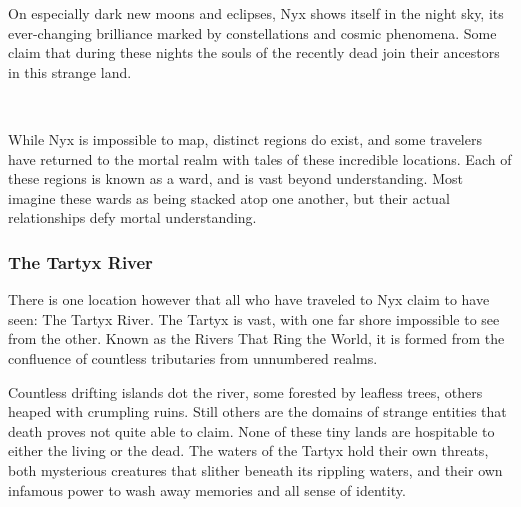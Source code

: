 On especially dark new moons and eclipses, Nyx shows itself in the night sky, its ever-changing brilliance marked by constellations and cosmic phenomena.
Some claim that during these nights the souls of the recently dead join their ancestors in this strange land.

\pagebreak~
\vspace{13.0cm}

While Nyx is impossible to map, distinct regions do exist, and some travelers have returned to the mortal realm with tales of these incredible locations.
Each of these regions is known as a ward, and is vast beyond understanding.
Most imagine these wards as being stacked atop one another, but their actual relationships defy mortal understanding.

\subsubsection{The Tartyx River}
There is one location however that all who have traveled to Nyx claim to have seen: The Tartyx River.
The Tartyx is vast, with one far shore impossible to see from the other.
Known as the Rivers That Ring the World, it is formed from the confluence of countless tributaries from unnumbered realms.

Countless drifting islands dot the river, some forested by leafless trees, others heaped with crumpling ruins.
Still others are the domains of strange entities that death proves not quite able to claim.
None of these tiny lands are hospitable to either the living or the dead.
The waters of the Tartyx hold their own threats, both mysterious creatures that slither beneath its rippling waters, and their own infamous power to wash away memories and all sense of identity.
